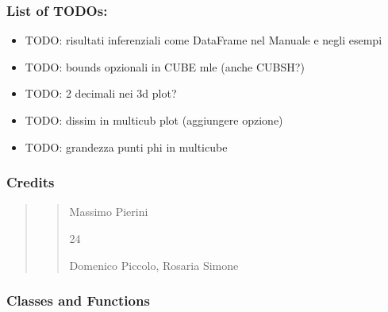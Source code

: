 \documentclass[letterpaper,10pt,english]{sphinxmanual}
\begin{document}
\subsubsection{List of TODOs:}
\label{\detokenize{cubmods:id93}}\begin{itemize}
\item {} 
\sphinxAtStartPar
TODO: risultati inferenziali come DataFrame nel Manuale e negli esempi

\item {} 
\sphinxAtStartPar
TODO: bounds opzionali in CUBE mle (anche CUBSH?)

\item {} 
\sphinxAtStartPar
TODO: 2 decimali nei 3d plot?

\item {} 
\sphinxAtStartPar
TODO: dissim in multicub plot (aggiungere opzione)

\item {} 
\sphinxAtStartPar
TODO: grandezza punti phi in multicube

\end{itemize}


\subsubsection{Credits}
\label{\detokenize{cubmods:id94}}\begin{quote}
\begin{quote}\begin{description}
\sphinxAtStartPar
Massimo Pierini

\sphinxhyphen{}24

\sphinxAtStartPar
Domenico Piccolo, Rosaria Simone

\sphinxAtStartPar
{}

\end{description}\end{quote}
\end{quote}


\subsubsection{Classes and Functions}
\label{\detokenize{cubmods:id95}}
\end{document}
